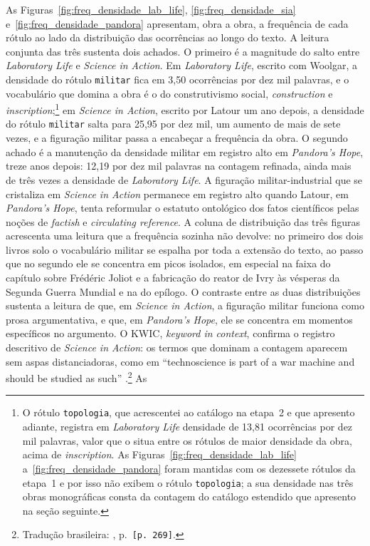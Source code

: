 As Figuras~\ref{fig:freq_densidade_lab_life}, \ref{fig:freq_densidade_sia} e~\ref{fig:freq_densidade_pandora} apresentam, obra a obra, a frequência de cada rótulo ao lado da distribuição das ocorrências ao longo do texto. A leitura conjunta das três sustenta dois achados. O primeiro é a magnitude do salto entre \emph{Laboratory Life} e \emph{Science in Action}. Em \emph{Laboratory Life}, escrito com Woolgar, a densidade do rótulo \texttt{militar} fica em 3,50 ocorrências por dez mil palavras, e o vocabulário que domina a obra é o do construtivismo social, \textit{construction} e \textit{inscription};\footnote{O rótulo \texttt{topologia}, que acrescentei ao catálogo na etapa~2 e que apresento adiante, registra em \emph{Laboratory Life} densidade de 13,81 ocorrências por dez mil palavras, valor que o situa entre os rótulos de maior densidade da obra, acima de \textit{inscription}. As Figuras~\ref{fig:freq_densidade_lab_life} a~\ref{fig:freq_densidade_pandora} foram mantidas com os dezessete rótulos da etapa~1 e por isso não exibem o rótulo \texttt{topologia}; a sua densidade nas três obras monográficas consta da contagem do catálogo estendido que apresento na seção seguinte.} em \emph{Science in Action}, escrito por Latour um ano depois, a densidade do rótulo \texttt{militar} salta para 25,95 por dez mil, um aumento de mais de sete vezes, e a figuração militar passa a encabeçar a frequência da obra. O segundo achado é a manutenção da densidade militar em registro alto em \emph{Pandora's Hope}, treze anos depois: 12,19 por dez mil palavras na contagem refinada, ainda mais de três vezes a densidade de \emph{Laboratory Life}. A figuração militar-industrial que se cristaliza em \emph{Science in Action} permanece em registro alto quando Latour, em \emph{Pandora's Hope}, tenta reformular o estatuto ontológico dos fatos científicos pelas noções de \textit{factish} e \textit{circulating reference}. A coluna de distribuição das três figuras acrescenta uma leitura que a frequência sozinha não devolve: no primeiro dos dois livros solo o vocabulário militar se espalha por toda a extensão do texto, ao passo que no segundo ele se concentra em picos isolados, em especial na faixa do capítulo sobre Frédéric Joliot e a fabricação do reator de Ivry às vésperas da Segunda Guerra Mundial e na do epílogo. O contraste entre as duas distribuições sustenta a leitura de que, em \emph{Science in Action}, a figuração militar funciona como prosa argumentativa, e que, em \emph{Pandora's Hope}, ele se concentra em momentos específicos no argumento. O KWIC, \textit{keyword in context}, confirma o registro descritivo de \emph{Science in Action}: os termos que dominam a contagem aparecem sem aspas distanciadoras, como em \enquote{technoscience is part of a war machine and should be studied as such} \parencite[p.~192]{Latour1987Science}.\footnote{Tradução brasileira: \textcite{Latour2011CienciaEmAcao}, p.~\texttt{[p. 269]}.} As 